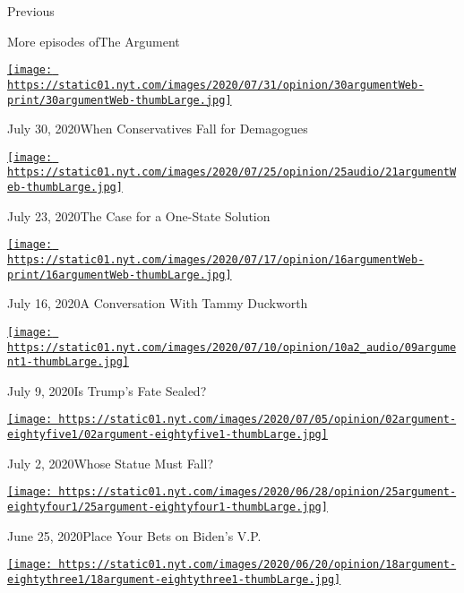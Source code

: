 Previous

More episodes ofThe Argument

\href{https://www.nytimes.com/2020/07/30/opinion/the-argument-authoritarianism-anne-applebaum.html?action=click\&module=audio-series-bar\&region=header\&pgtype=Article}{\texttt{[image: https://static01.nyt.com/images/2020/07/31/opinion/30argumentWeb-print/30argumentWeb-thumbLarge.jpg]}}

July 30, 2020When Conservatives Fall for Demagogues

\href{https://www.nytimes.com/2020/07/23/opinion/the-argument-israel-palestinian.html?action=click\&module=audio-series-bar\&region=header\&pgtype=Article}{\texttt{[image: https://static01.nyt.com/images/2020/07/25/opinion/25audio/21argumentWeb-thumbLarge.jpg]}}

July 23, 2020The Case for a One-State Solution

\href{https://www.nytimes.com/2020/07/16/opinion/the-argument-tammy-duckworth.html?action=click\&module=audio-series-bar\&region=header\&pgtype=Article}{\texttt{[image: https://static01.nyt.com/images/2020/07/17/opinion/16argumentWeb-print/16argumentWeb-thumbLarge.jpg]}}

July 16, 2020A Conversation With Tammy Duckworth

\href{https://www.nytimes.com/2020/07/09/opinion/is-trumps-fate-sealed.html?action=click\&module=audio-series-bar\&region=header\&pgtype=Article}{\texttt{[image: https://static01.nyt.com/images/2020/07/10/opinion/10a2\_audio/09argument1-thumbLarge.jpg]}}

July 9, 2020Is Trump's Fate Sealed?

\href{https://www.nytimes.com/2020/07/02/opinion/the-argument-protest-statue-revolution.html?action=click\&module=audio-series-bar\&region=header\&pgtype=Article}{\texttt{[image: https://static01.nyt.com/images/2020/07/05/opinion/02argument-eightyfive1/02argument-eightyfive1-thumbLarge.jpg]}}

July 2, 2020Whose Statue Must Fall?

\href{https://www.nytimes.com/2020/06/25/opinion/the-argument-biden-vice-president-supreme-court.html?action=click\&module=audio-series-bar\&region=header\&pgtype=Article}{\texttt{[image: https://static01.nyt.com/images/2020/06/28/opinion/25argument-eightyfour1/25argument-eightyfour1-thumbLarge.jpg]}}

June 25, 2020Place Your Bets on Biden's V.P.

\href{https://www.nytimes.com/2020/06/18/opinion/the-argument-tom-cotton-resignation.html?action=click\&module=audio-series-bar\&region=header\&pgtype=Article}{\texttt{[image: https://static01.nyt.com/images/2020/06/20/opinion/18argument-eightythree1/18argument-eightythree1-thumbLarge.jpg]}}

